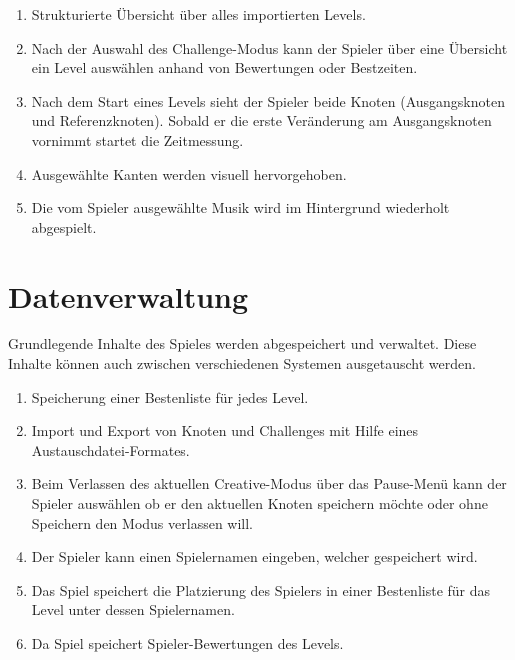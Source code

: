 \begin{enumerate}[resume]
\item Strukturierte Übersicht über alles importierten Levels.
\item Nach der Auswahl des Challenge-Modus kann der Spieler über eine Übersicht ein Level auswählen anhand von Bewertungen oder Bestzeiten.
\item Nach dem Start eines Levels sieht der Spieler beide Knoten (Ausgangsknoten und Referenzknoten). Sobald er die erste Veränderung am Ausgangsknoten vornimmt startet die Zeitmessung.
\item Ausgewählte Kanten werden visuell hervorgehoben.
\item Die vom Spieler ausgewählte Musik wird im Hintergrund wiederholt abgespielt.

\end{enumerate}
\section{Datenverwaltung}
Grundlegende Inhalte des Spieles werden abgespeichert und verwaltet.
Diese Inhalte können auch zwischen verschiedenen Systemen ausgetauscht werden. 

\begin{enumerate}[resume]
\item Speicherung einer Bestenliste für jedes Level.
\item Import und Export von Knoten und Challenges mit Hilfe eines Austauschdatei-Formates.
\item Beim Verlassen des aktuellen Creative-Modus über das Pause-Menü  kann der Spieler auswählen ob er den aktuellen Knoten speichern möchte oder ohne Speichern den Modus verlassen will.
\item Der Spieler kann einen Spielernamen eingeben, welcher gespeichert wird.
\item Das Spiel speichert die Platzierung des Spielers in einer Bestenliste für das Level unter dessen Spielernamen.
\item Da Spiel speichert Spieler-Bewertungen des Levels.



\end{enumerate}

	
